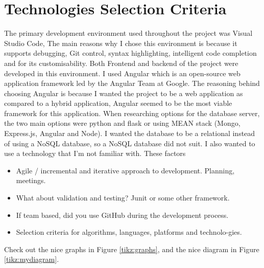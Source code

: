 \section{Technologies Selection Criteria}
The primary development environment used throughout the project was Visual Studio Code, The main reasons why I chose this environment is because it supports debugging, Git control, syntax highlighting, intelligent code completion and for its customisability. Both Frontend and backend of the project were developed in this environment.
I used Angular which is an open-source web application framework led by the Angular Team at Google. The reasoning behind choosing Angular is because I wanted the project to be a web application as compared to a hybrid application, Angular seemed to be the most viable framework for this application.
When researching options for the database server, the two main options were python and flask or using MEAN stack (Mongo, Express.js, Angular and Node). I wanted the database to be a relational instead of using a NoSQL database, so a NoSQL database did not suit. I also wanted to use a technology that I'm not familiar with. These factors
\par
\begin{itemize}
	\item Agile / incremental and iterative approach to development. Planning, meetings.
	\item What about validation and testing? Junit or some other framework.
	\item If team based, did you use GitHub during the development process.
	\item Selection criteria for algorithms, languages, platforms and technolo-gies.
\end{itemize}
Check out the nice graphs in Figure \ref{tikz:graphs}, and the nice diagram in Figure \ref{tikz:mydiagram}.


